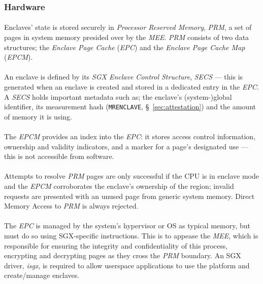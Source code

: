 \subsubsection{Hardware}
\paragraph{} Enclaves' state is stored securely in \textit{Processor Reserved Memory}, \textit{PRM}, a set of pages in system memory presided over by the \textit{MEE}. \textit{PRM} consists of two data structures; the \textit{Enclave Page Cache} (\textit{EPC}) and the \textit{Enclave Page Cache Map} (\textit{EPCM}).

\paragraph{} An enclave is defined by its \textit{SGX Enclave Control Structure}, \textit{SECS} --- this is generated when an enclave is created and stored in a dedicated entry in the \textit{EPC}. A \textit{SECS} holds important metadata such as; the enclave's (system-)global identifier, its measurement hash (\texttt{MRENCLAVE}, §~\ref{sec:attestation}) and the amount of memory it is using.

\paragraph{} The \textit{EPCM} provides an index into the \textit{EPC}: it stores access control information, ownership and validity indicators, and a marker for a page's designated use --- this is not accessible from software. 

\paragraph{} Attempts to resolve \textit{PRM} pages are only successful if the CPU is in enclave mode and the \textit{EPCM} corroborates the enclave's ownership of the region; invalid requests are presented with an unused page from generic system memory. Direct Memory Access to \textit{PRM} is always rejected.

\paragraph{} The \textit{EPC} is managed by the system's hypervisor or OS as typical memory, but must do so using SGX-specific instructions. This is to appease the \textit{MEE}, which is responsible for ensuring the integrity and confidentiality of this process, encrypting and decrypting pages as they cross the \textit{PRM} boundary. An SGX driver, \textit{isgx}, is required to allow userspace applications to use the platform and create/manage enclaves.


